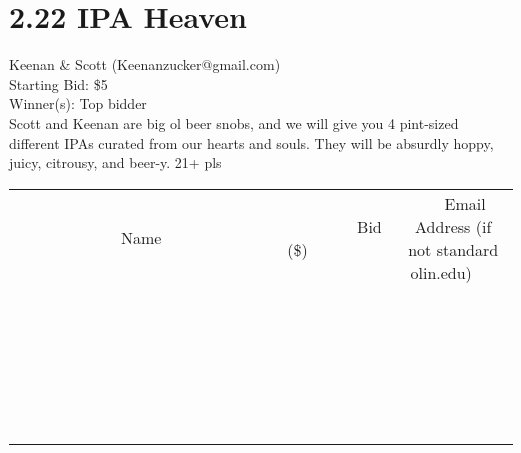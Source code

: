 \documentclass[11pt]{article}
\begin{document}
\section*{2.22 IPA Heaven }
Keenan \& Scott (Keenanzucker@gmail.com) \\
Starting Bid: \$5 \\
Winner(s): 
Top bidder \\
Scott and Keenan are big ol beer snobs, and we will give you 4 pint-sized different IPAs curated from our hearts and souls. They will be absurdly hoppy, juicy, citrousy, and beer-y. 21+ pls \\[6ex]
\begin{tabular}{c c c}
~~~~~~~~~~~~~Name~~~~~~~~~~~~~ & ~~~~~~~~~Bid (\$)~~~~~~~~~ & ~~~Email Address (if not standard olin.edu)~~~ \\
 & & \\
\hline
 & & \\
\hline
 & & \\
\hline
 & & \\
\hline
 & & \\
\hline
 & & \\
\hline
 & & \\
\hline
 & & \\
\hline
 & & \\
\hline
 & & \\
\hline
 & & \\
\hline
 & & \\
\hline
 & & \\
\hline
 & & \\
\hline
 & & \\
\hline
 & & \\
\hline
 & & \\
\hline
 & & \\
\hline
 & & \\
\hline
 & & \\
\hline
 & & \\
\hline
 & & \\
\hline
 & & \\
\hline
 & & \\
\hline
 & & \\
\hline
 & & \\
\hline
\end{tabular}
\clearpage
\end{document}
